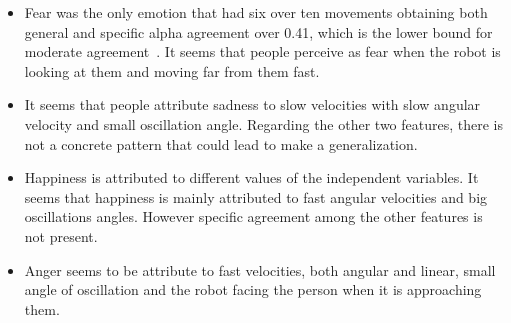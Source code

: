\begin{itemize}

	\item Fear was the only emotion that had six over ten movements obtaining both general and specific alpha agreement over 0.41, which is the lower bound for moderate agreement~\cite{Viera2005}. It seems that people perceive as fear when the robot is looking at them and moving far from them fast. 
	
	\item It seems that people attribute sadness to slow velocities with slow angular velocity and small oscillation angle. Regarding the other two features, there is not a concrete pattern that could lead to make a generalization. 

	\item Happiness is attributed to different values of the independent variables. It seems that happiness is mainly attributed to fast angular velocities and big oscillations angles. However specific agreement among the other features is not present.

	\item Anger seems to be attribute to fast velocities, both angular and linear, small angle of oscillation and the robot facing the person when it is approaching them. 
	
\end{itemize} 
